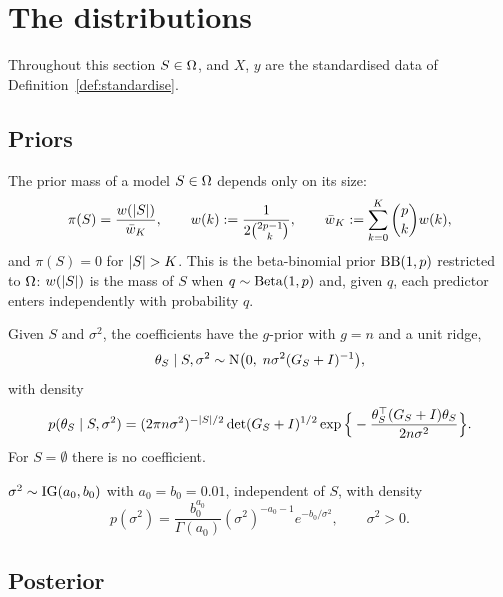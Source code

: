 \section{The distributions}\label{sec:prior}

Throughout this section $S\in\Omega$, and $X$, $y$ are the standardised data of Definition~\ref{def:standardise}.

\subsection{Priors}

\begin{definition}\label{def:modelprior}
The prior mass of a model $S\in\Omega$ depends only on its size:
\begin{equation}\label{eq:modelprior}
  \pi(S)=\frac{w(\lvert S\rvert)}{\bar w_K},\qquad w(k):=\frac{1}{2\binom{2p-1}{k}},\qquad
  \bar w_K:=\sum_{k=0}^{K}\binom{p}{k}w(k),
\end{equation}
and $\pi(S)=0$ for $\lvert S\rvert>K$. This is the beta-binomial prior $\mathrm{BB}(1,p)$ restricted to $\Omega$: $w(\lvert S\rvert)$ is the mass
of $S$ when $q\sim\mathrm{Beta}(1,p)$ and, given $q$, each predictor enters independently with probability $q$.
\end{definition}

\begin{definition}\label{def:slab}
Given $S$ and $\sigma^2$, the coefficients have the $g$-prior with $g=n$ and a unit ridge,
\begin{equation}\label{eq:slab}
  \theta_S\mid S,\sigma^2\sim\mathrm{N}\big(0,\;n\sigma^2(G_S+I)^{-1}\big),
\end{equation}
with density
\[
  p(\theta_S\mid S,\sigma^2)=(2\pi n\sigma^2)^{-\lvert S\rvert/2}\det(G_S+I)^{1/2}
  \exp\Big\{-\frac{\theta_S^\top(G_S+I)\theta_S}{2n\sigma^2}\Big\}.
\]
For $S=\emptyset$ there is no coefficient.
\end{definition}

\begin{definition}\label{def:ig}
$\sigma^2\sim\mathrm{IG}(a_0,b_0)$ with $a_0=b_0=0.01$, independent of $S$, with density
\[
  p(\sigma^2)=\frac{b_0^{a_0}}{\Gamma(a_0)}(\sigma^2)^{-a_0-1}e^{-b_0/\sigma^2},\qquad \sigma^2>0 .
\]
\end{definition}

\subsection{Posterior}


